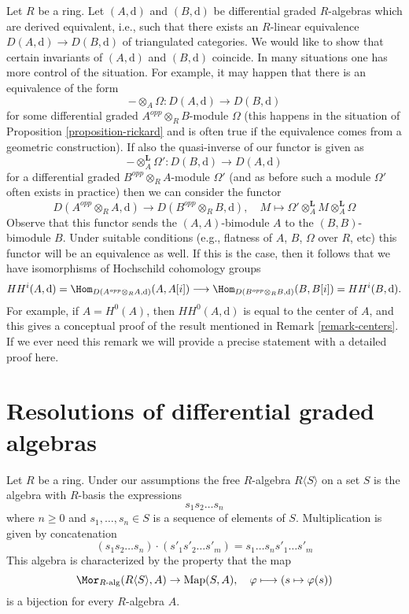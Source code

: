 \begin{remark}
\label{remark-hochschild-cohomology}
Let $R$ be a ring. Let $(A, \text{d})$ and $(B, \text{d})$ be differential
graded $R$-algebras which are derived equivalent, i.e., such that there
exists an $R$-linear equivalence $D(A, \text{d}) \to D(B, \text{d})$
of triangulated categories. We would like to show that certain invariants
of $(A, \text{d})$ and $(B, \text{d})$ coincide. In many situations
one has more control of the situation. For example, it may happen
that there is an equivalence of the form
$$
- \otimes_A \Omega : D(A, \text{d}) \longrightarrow D(B, \text{d})
$$
for some differential graded $A^{opp}\otimes_R B$-module
$\Omega$ (this happens in the situation of
Proposition \ref{proposition-rickard} and is often true
if the equivalence comes from a geometric construction).
If also the quasi-inverse of our functor is given as
$$
- \otimes_A^\mathbf{L} \Omega' : D(B, \text{d}) \longrightarrow D(A, \text{d})
$$
for a differential graded $B^{opp}\otimes_R A$-module $\Omega'$
(and as before such a module $\Omega'$ often exists in practice)
then we can consider the functor
$$
D(A^{opp} \otimes_R A, \text{d})
\longrightarrow
D(B^{opp} \otimes_R B, \text{d}),\quad
M \longmapsto \Omega' \otimes^\mathbf{L}_A M \otimes_A^\mathbf{L} \Omega
$$
Observe that this functor sends the $(A, A)$-bimodule $A$ to
the $(B, B)$-bimodule $B$. Under suitable conditions
(e.g., flatness of $A$, $B$, $\Omega$ over $R$, etc)
this functor will be an equivalence as well.
If this is the case, then it follows that we have isomorphisms
of Hochschild cohomology groups
$$
HH^i(A, \text{d}) =
\Hom_{D(A^{opp} \otimes_R A, \text{d})}(A, A[i])
\longrightarrow
\Hom_{D(B^{opp} \otimes_R B, \text{d})}(B, B[i]) =
HH^i(B, \text{d}).
$$
For example, if $A = H^0(A)$, then $HH^0(A, \text{d})$
is equal to the center of $A$, and this gives a conceptual proof
of the result mentioned in Remark \ref{remark-centers}.
If we ever need this remark we will provide a precise statement
with a detailed proof here.
\end{remark}



\section{Resolutions of differential graded algebras}
\label{section-resolution-dgas}

\noindent
Let $R$ be a ring. Under our assumptions the free $R$-algebra
$R\langle S \rangle$ on a set $S$ is the algebra with $R$-basis
the expressions
$$
s_1 s_2 \ldots s_n
$$
where $n \geq 0$ and $s_1, \ldots, s_n \in S$ is a sequence of
elements of $S$. Multiplication is given by concatenation
$$
(s_1 s_2 \ldots s_n) \cdot (s'_1 s'_2 \ldots s'_m) =
s_1 \ldots s_n s'_1 \ldots s'_m
$$
This algebra is characterized by the property that the map
$$
\Mor_{R\text{-alg}}(R\langle S \rangle, A) \to
\text{Map}(S, A),\quad
\varphi \longmapsto (s \mapsto \varphi(s))
$$
is a bijection for every $R$-algebra $A$.

